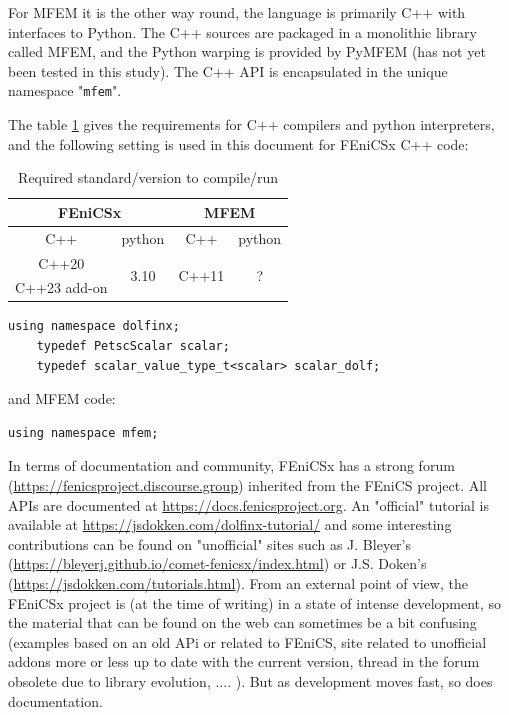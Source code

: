 \documentclass[12pt]{article}
\newcommand{\f}[1]{FEniCSx#1}
\newcommand{\mycode}[1]{\textsf{"}\lstinline`#1`\textsf{"}}
\begin{document}
\bigskip
For MFEM it is the other way round, the language is primarily C++ with interfaces to Python.
The C++ sources are packaged in a monolithic library called MFEM, and the Python warping is provided by PyMFEM (has not yet been tested in this study).
The C++ API is encapsulated in the unique namespace \mycode{mfem}.
	
\bigskip
The table \ref{libstd} gives the requirements for C++ compilers and python interpreters, and the following setting is  used in this document for  \f{} C++ code:
\begin{table}
	\centering
	\begin{tabular}{|c|c|c|c|}
		\hline
		\multicolumn{2}{|c|}{\f{}}&\multicolumn{2}{c|}{MFEM}\\
		\hline
		C++&python&C++&python
		\\
		\hline
		C++20&\multirow{2}{*}{3.10}&\multirow{2}{*}{C++11}&\multirow{2}{*}{?}\\
		C++23 add-on&&&\\
		\hline
	\end{tabular}
	\caption{ Required standard/version to compile/run\label{libstd} }
\end{table}
 
\begin{lstlisting}[numbers=none,basicstyle=\scriptsize,label=typedeffenicsx]
	using namespace dolfinx;
	typedef PetscScalar scalar;
	typedef scalar_value_type_t<scalar> scalar_dolf;
\end{lstlisting}
and MFEM code:
\begin{lstlisting}[numbers=none,basicstyle=\scriptsize,label=typedefmfem]
	using namespace mfem;
\end{lstlisting}

	
In terms of documentation and community, \f{} has a strong forum (\url{https://fenicsproject.discourse.group}) inherited from the FEniCS project. 
All APIs are documented at \url{https://docs.fenicsproject.org}. 
An "official" tutorial is available at \url{https://jsdokken.com/dolfinx-tutorial/} and some interesting contributions can be found on "unofficial" sites such as J. Bleyer's (\url{https://bleyerj.github.io/comet-fenicsx/index.html}) or J.S. Doken's (\url{https://jsdokken.com/tutorials.html}).
From an external point of view, the \f{} project is (at the time of writing) in a state of intense development, so the material that can be found on the web can sometimes be a bit confusing (examples based on an old APi or related to FEniCS, site related to unofficial addons more or less up to date with the current version, thread in the forum obsolete due to library evolution, ....  ). 
But as development moves fast, so does documentation.
\end{document}
